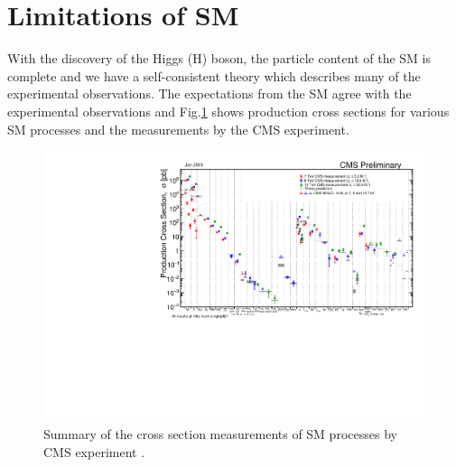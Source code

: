 \section{Limitations of SM}
\label{SMLimitations}
With the discovery of the Higgs (H) boson, the particle content of the SM is complete and we have a self-consistent theory
which describes many of the experimental observations. The 
expectations from the SM agree with the experimental observations and Fig.\ref{fig:SigmaNew_v0} shows production cross sections for 
various SM processes and the measurements by the CMS experiment.
\begin{figure}[h]
\centering
\includegraphics[width=0.9\linewidth]{../Figures/Chap1/SigmaNew_v0}
\caption[SM cross section measurements by CMS]{Summary of the cross section measurements of SM processes by CMS experiment \cite{SMxsec}.}
\label{fig:SigmaNew_v0}
\end{figure}

